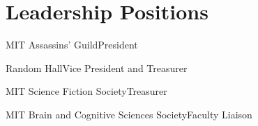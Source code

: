 \documentclass[11pt,letter]{moderncv}
\begin{document}
\section{Leadership Positions}

{MIT Assassins' Guild}{}{President}{}{}

{Random Hall}{}{Vice President and Treasurer}{}{}

{MIT Science Fiction Society}{}{Treasurer}{}{}

{MIT Brain and Cognitive Sciences Society}{}{Faculty Liaison}{}{}
\end{document}

